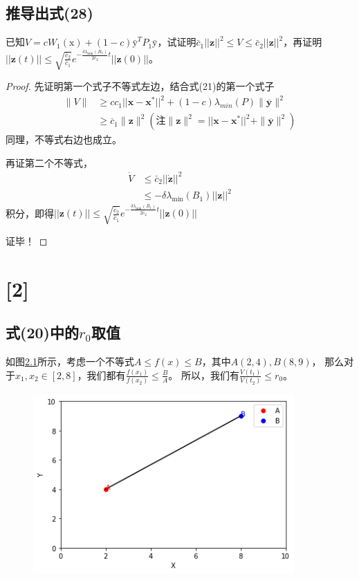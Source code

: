 \documentclass[lang=cn,10pt]{elegantbook}
\newcommand\bv[1]{\boldsymbol{#1}}
\begin{document}
\section{推导出式(28)}
已知$V=cW_1(\mathrm{x})+(1-c)\bar{\mathrm{y}}^TP_1\bar{\mathrm{y}}$，试证明$\bar{c}_1||\mathbf{z}||^2\leq V\leq\bar{c}_2||\mathbf{z}||^2$，再证明
$||\mathbf{z}(t)||\leq\sqrt{\frac{\bar{c}_{2}}{\bar{c}_{1}}}e^{-\frac{\delta\lambda_{\min}(B_{1})}{2\bar{c}_{2}}t}||\mathbf{z}(0)||$。
\begin{proof}
	先证明第一个式子不等式左边，结合式(21)的第一个式子
	\begin{equation*}
		\begin{aligned}
			\|V\| & \geq cc_1||\mathbf{x}-\mathbf{x}^*||^2 + (1-c)\lambda_{min}(P)\|\bv{\overline{y}}\|^2                         \\
			      & \geq \overline{c}_1 \|\bv{z}\|^2(\text{注}\|\bv{z}\|^2=||\mathbf{x}-\mathbf{x}^*||^2+\|\bv{\overline{y}}\|^2)
		\end{aligned}
	\end{equation*}
	同理，不等式右边也成立。

	再证第二个不等式，
	\begin{equation*}
		\begin{aligned}
			\dot{V} & \leq \bar{c}_{2}||\mathbf{\dot{z}}||^{2}        \\
			        & \leq -\delta\lambda_{\min}(B_1)||\mathbf{z}||^2
		\end{aligned}
	\end{equation*}
	积分，即得$||\mathbf{z}(t)||\leq\sqrt{\frac{\bar{c}_{2}}{\bar{c}_{1}}}e^{-\frac{\delta\lambda_{\min}(B_{1})}{2\bar{c}_{2}}t}||\mathbf{z}(0)||$

	证毕！
\end{proof}

\chapter{[2]}
\section{式(20)中的$r_0$取值}
如图\ref{imB_1}所示，考虑一个不等式$A\leq f(x) \leq B$，其中$A(2,4),B(8,9)$，
那么对于$x_1,x_2\in [2,8]$，我们都有$\frac{f(x_1)}{f(x_2)}\leq\frac BA$。
所以，我们有$\frac{V(t_1)}{V(t_2)}\leq r_0$。

\begin{figure}[hp]
	\centering
	\includegraphics[width=10cm]{img/imB_1.png}
	\caption{}
	\label{imB_1}
\end{figure}
\end{document}
